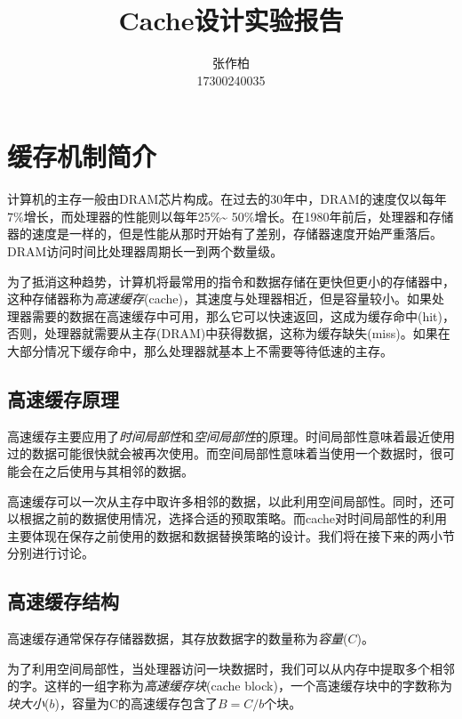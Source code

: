 \documentclass[12pt]{article} %
\title{\textbf{Cache设计实验报告}}
\author{张作柏\\17300240035}
\begin{document}
\begin{sloppypar}
\maketitle

\pagestyle{fancy}
\lhead{\textbf{{\thetitle}}}
\rhead{\textbf{\nouppercase{\firstleftmark}}}
\cfoot{\thepage}

\thispagestyle{empty}
\tableofcontents
\clearpage

\setcounter{page}{1}

\section{缓存机制简介}

计算机的主存一般由DRAM芯片构成。在过去的30年中，DRAM的速度仅以每年7\%增长，而处理器的性能则以每年25\%\~{} 50\%增长。在1980年前后，处理器和存储器的速度是一样的，但是性能从那时开始有了差别，存储器速度开始严重落后。DRAM访问时间比处理器周期长一到两个数量级。

为了抵消这种趋势，计算机将最常用的指令和数据存储在更快但更小的存储器中，这种存储器称为{\em 高速缓存}(cache)，其速度与处理器相近，但是容量较小。如果处理器需要的数据在高速缓存中可用，那么它可以快速返回，这成为缓存命中(hit)，否则，处理器就需要从主存(DRAM)中获得数据，这称为缓存缺失(miss)。如果在大部分情况下缓存命中，那么处理器就基本上不需要等待低速的主存。


\subsection{高速缓存原理}

高速缓存主要应用了{\em 时间局部性}和{\em 空间局部性}的原理。时间局部性意味着最近使用过的数据可能很快就会被再次使用。而空间局部性意味着当使用一个数据时，很可能会在之后使用与其相邻的数据。

高速缓存可以一次从主存中取许多相邻的数据，以此利用空间局部性。同时，还可以根据之前的数据使用情况，选择合适的预取策略。而cache对时间局部性的利用主要体现在保存之前使用的数据和数据替换策略的设计。我们将在接下来的两小节分别进行讨论。

\subsection{高速缓存结构}

高速缓存通常保存存储器数据，其存放数据字的数量称为{\em 容量}($C$)。

为了利用空间局部性，当处理器访问一块数据时，我们可以从内存中提取多个相邻的字。这样的一组字称为{\em 高速缓存块}(cache block)，一个高速缓存块中的字数称为{\em 块大小}($b$)，容量为C的高速缓存包含了$B=C/b$个块。


\end{sloppypar}
\end{document}
